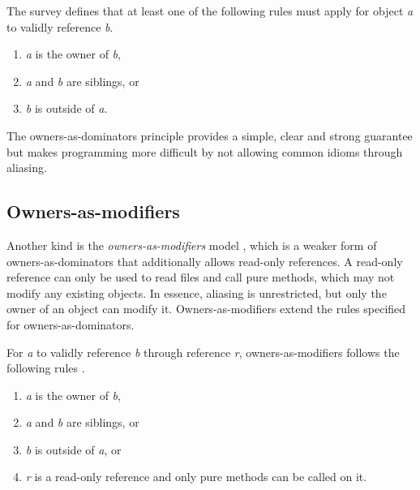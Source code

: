 \documentclass[sigplan,11pt,nonacm]{acmart}
\begin{document}
The survey \cite{ownership-types-survey} defines that at least one of the following rules must apply for object \emph{a} to validly reference \emph{b}.
\begin{enumerate}
  \item \emph{a} is the owner of \emph{b},
  \item \emph{a} and \emph{b} are siblings, or
  \item \emph{b} is outside of \emph{a}.
\end{enumerate}

The owners-as-dominators principle provides a simple, clear and strong guarantee but makes programming more difficult by not allowing common idioms through aliasing.


\subsection{Owners-as-modifiers}
\label{sec:owners-as-modifiers}

Another kind is the \emph{owners-as-modifiers} model \cite{ownership-types-survey}, which is a weaker form of owners-as-dominators that additionally allows read-only references.
A read-only reference can only be used to read files and call pure methods, which may not modify any existing objects.
In essence, aliasing is unrestricted, but only the owner of an object can modify it.
Owners-as-modifiers extend the rules specified for owners-as-dominators.

For \emph{a} to validly reference \emph{b} through reference \emph{r}, owners-as-modifiers follows the following rules \cite{ownership-types-survey}.
\begin{enumerate}
  \item \emph{a} is the owner of \emph{b},
  \item \emph{a} and \emph{b} are siblings, or
  \item \emph{b} is outside of \emph{a}, or
  \item \emph{r} is a read-only reference and only pure methods can be called on it.
\end{enumerate}
\end{document}
